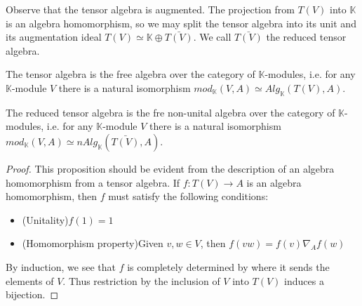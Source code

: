 \documentclass[../../thesis.tex]{subfiles}
\begin{document}
            Observe that the tensor algebra is augmented. The projection from $T(V)$ into $\mathbb{K}$ is an algebra homomorphism, so we may split the tensor algebra into its unit and its augmentation ideal $T(V) \simeq \mathbb{K}\oplus\bar{T(V)}$. We call $\bar{T(V)}$ the reduced tensor algebra.

            \begin{proposition}
                The tensor algebra is the free algebra over the category of $\mathbb{K}$-modules, i.e. for any $\mathbb{K}$-module $V$ there is a natural isomorphism $mod_{\mathbb{K}}(V,A)\simeq Alg_{\mathbb{K}}(T(V),A)$.

                The reduced tensor algebra is the fre non-unital algebra over the category of $\mathbb{K}$-modules, i.e. for any $\mathbb{K}$-module $V$ there is a natural isomorphism $mod_{\mathbb{K}}(V,A)\simeq nAlg_{\mathbb{K}}(\bar{T(V)},A)$.
            \end{proposition}

            \begin{proof}
                This proposition should be evident from the description of an algebra homomorphism from a tensor algebra. If $f: T(V) \rightarrow A$ is an algebra homomorphism, then $f$ must satisfy the following conditions:
                \begin{itemize}
                    \item (Unitality)\quad $f(1) = 1$
                    \item (Homomorphism property)\quad Given $v,w\in V$, then $f(vw) = f(v)\nabla_Af(w)$
                \end{itemize}
                By induction, we see that $f$ is completely determined by where it sends the elements of $V$. Thus restriction by the inclusion of $V$ into $T(V)$ induces a bijection.
            \end{proof}
\end{document}
